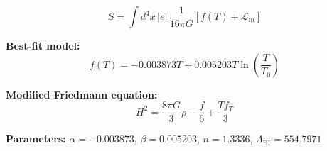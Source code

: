 
\begin{equation}
  S = \int d^4x \, |e| \, \frac{1}{16\pi G} \left[ f(T) + \mathcal{L}_m \right]
\end{equation}

\textbf{Best-fit model:}
\begin{equation}
  f(T) = -0.003873 T + 0.005203 T \ln\!\left(\frac{T}{T_0}\right)
\end{equation}

\textbf{Modified Friedmann equation:}
\begin{equation}
  H^2 = \frac{8\pi G}{3} \rho - \frac{f}{6} + \frac{T f_T}{3}
\end{equation}

\textbf{Parameters:}
$\alpha = -0.003873$, \quad
$\beta = 0.005203$, \quad
$n = 1.3336$, \quad
$\Lambda_{\text{BI}} = 554.7971$